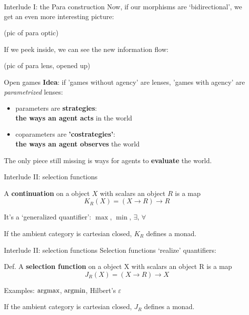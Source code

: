 \begin{frame}{Interlude I: the Para construction}
	Now, if our morphisms are `bidirectional', we get an even more interesting picture:

	(pic of para optic)

	If we peek inside, we can see the new information flow:

	(pic of para lens, opened up)
\end{frame}

\begin{frame}{Open games}
	\textbf{Idea}: if 'games without agency' are lenses, 'games with agency' are \emph{parametrized} lenses:

	\vfill
	\begin{itemize}
		\item parameters are \textbf{strategies}:\\
		\qquad \textbf{the ways an agent acts} in the world\\[3.5ex]
		\item coparameters are \textbf{'costrategies'}:\\
		\qquad \textbf{the ways an agent observes} the world
	\end{itemize}

	\vfill
	The only piece still missing is ways for agents to \textbf{evaluate} the world.
\end{frame}

\begin{frame}{Interlude II: selection functions}
	\begin{definition}
		A \textbf{continuation} on a object $X$ with scalars an object $R$ is a map
		\begin{equation*}
			K_R(X) = (X \to R) \to R
		\end{equation*}
	\end{definition}

	It's a `generalized quantifier': $\max$, $\min$, $\exists$, $\forall$

	\vfill
	If the ambient category is cartesian closed, $K_R$ defines a monad.
\end{frame}

\begin{frame}{Interlude II: selection functions}
	Selection functions `realize' quantifiers:

	\vfill
	\begin{definition}
		Def. A \textbf{selection function} on a object X with scalars an object R is a map
		\begin{equation*}
			J_R(X) = (X \to R) \to X
		\end{equation*}
	\end{definition}

	Examples: $\operatorname{argmax}$, $\operatorname{argmin}$, Hilbert's $\varepsilon$

	\vfill
	If the ambient category is cartesian closed, $J_R$ defines a monad.
\end{frame}

